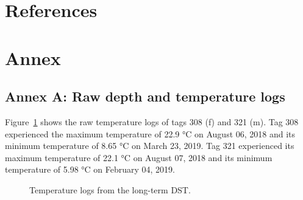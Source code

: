 \documentclass[
  authoryear,
  review,
  3p]{elsarticle}
\begin{document}
\newpage{}

\hypertarget{references}{%
\section*{References}\label{references}}

\renewcommand{\bibsection}{}


\newpage{}

\hypertarget{annex}{%
\section*{Annex}\label{annex}}

\hypertarget{annex-a-raw-depth-and-temperature-logs}{%
\subsection*{\texorpdfstring{\textbf{Annex A}: Raw depth and temperature
logs}{Annex A: Raw depth and temperature logs}}\label{annex-a-raw-depth-and-temperature-logs}}

Figure~\ref{fig-dsttempannex} shows the raw temperature logs of tags 308
(f) and 321 (m). Tag 308 experienced the maximum temperature of 22.9 °C
on August 06, 2018 and its minimum temperature of 8.65 °C on March 23,
2019. Tag 321 experienced its maximum temperature of 22.1 °C on August
07, 2018 and its minimum temperature of 5.98 °C on February 04, 2019.

\begin{figure}

\begin{minipage}[t]{\linewidth}

{\centering 


}

\end{minipage}%
\newline
\begin{minipage}[t]{\linewidth}

{\centering 


}

\end{minipage}%

\caption{\label{fig-dsttempannex}Temperature logs from the long-term
DST.}

\end{figure}
\end{document}
